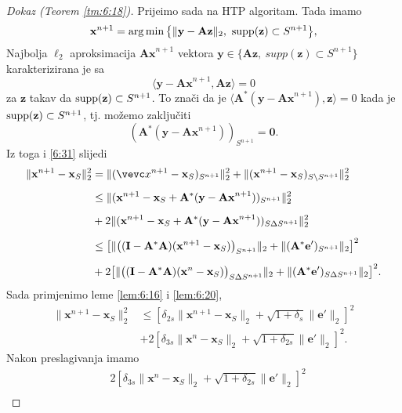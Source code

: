 \documentclass[a4paper,twoside,12pt]{memoir} %
\newcommand{\vect}[1]{\mathbf{#1}}
\renewcommand{\vec}{\vect}
\newcommand{\supp}{\text{\normalfont{supp}}}
\newcommand{\norm}[1]{\|{#1}\|}
\DeclareMathOperator*{\argmin}{arg\,min}
\begin{document}
\begin{proof}[Dokaz (Teorem \ref{tm:6:18})]
    \indent
    Prije\dj imo sada na HTP algoritam. Tada imamo
    \begin{equation*}
        \vec x^{n+1} = \argmin \big\{ \norm{\vec y - \vec{Az}}_2,\ \supp(\vec z) \subset S^{n+1} \big\},
    \end{equation*}
    Najbolja $\ell_2$ aproksimacija $\vec {Ax}^{n+1}$ vektora $\vec y \in \{\vec{Az},\ supp(\vec z) \subset S^{n+1}\}$ karakterizirana je sa
    \begin{equation*}
        \langle \vec y - \vec {Ax}^{n+1}, \vec{Az} \rangle = 0 
    \end{equation*}
    za $\vec z$ takav da $\supp(\vec z) \subset S^{n+1}$. To zna\v{c}i da je $\langle \vec A^*(\vec y - \vec{Ax}^{n+1}), \vec z \rangle = 0$ kada je $\supp(\vec z) \subset S^{n+1}$, tj. mo\v{z}emo zaklju\v{c}iti
    \begin{equation*}
        (\vec A^*(\vec y - \vec {Ax}^{n+1}))_{S^{n+1}} = \vec 0.
    \end{equation*}
    Iz toga i \eqref{6:31} slijedi
    \begin{align*}
        \norm{\vec x^{n+1} - \vec x_S}_2^2 & = \norm{(\vevc x^{n+1} - \vec x_S)_{S^{n+1}}}_2^2 + \norm{(\vec x^{n+1} - \vec x_S)_{S \backslash S^{n+1}}}_2^2\\[0.5em]
        & \leq \norm{(\vec x^{n+1} - \vec x_S + \vec A^*(\vec y - \vec {Ax}^{n+1}))_{S^{n+1}}}_2^2\\[0.5em]
        & + 2 \norm{(\vec x^{n+1} - \vec x_S + \vec A^*(\vec y - \vec {Ax}^{n+1}))_{S \Delta S^{n+1}}}_2^2\\[0.5em]
        & \leq \big[ \norm{\big( (\vec I - \vec A^* \vec A)(\vec x^{n+1} - \vec x_S) \big)_{S^{n+1}}}_2 + \norm{(\vec A^* \vec e')_{S^{n+1}}}_2 \big]^2\\[0.5em]
        & + 2 \big[ \norm{ \big( (\vec I - \vec A^* \vec A)(\vec x^n - \vec x_S) \big)_{S \Delta S^{n+1}} }_2 + \norm{(\vec A^* \vec e')_{S \Delta S^{n+1}}}_2 \big]^2.
    \end{align*}
    Sada primjenimo leme \ref{lem:6:16} i \ref{lem:6:20},
    \begin{align*}
    \norm{\vec x^{n+1} - \vec x_S}_2^2 & \leq [\delta_{2s} \norm{\vec x^{n+1} - \vec x_S}_2 + \sqrt{1+\delta_s} \norm{\vec e'}_2]^2\\[0.5em]
    & + 2 [\delta_{3s} \norm{\vec x^n - \vec x_S}_2 + \sqrt{1 + \delta_{2s}} \norm{\vec e'}_2]^2.
    \end{align*}
    Nakon preslagivanja imamo
    \begin{align*}
        &2[\delta_{3s} \norm{\vec x^n - \vec x_S}_2 + \sqrt{1 + \delta_{2s}} \norm{\vec e '}_2]^2\\[0.5em]

\end{align*}
\end{proof}
\end{document}
